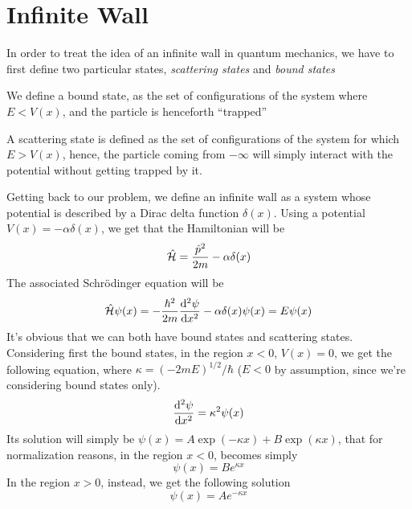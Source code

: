 \documentclass[../qm.tex]{subfiles}
\begin{document}
	\section{Infinite Wall}
	In order to treat the idea of an infinite wall in quantum mechanics, we have to first define two particular states, \textit{scattering states} and \textit{bound states}\\
	\begin{defn}
		We define a bound state, as the set of configurations of the system where $E<V(x)$, and the particle is henceforth ``trapped''
	\end{defn}
	\begin{defn}
		A scattering state is defined as the set of configurations of the system for which $E>V(x)$, hence, the particle coming from $-\infty$ will simply interact with the potential without getting trapped by it.
	\end{defn}
	Getting back to our problem, we define an infinite wall as a system whose potential is described by a Dirac delta function $\delta(x)$. Using a potential $V(x)=-\alpha\delta(x)$, we get that the Hamiltonian will be
	\begin{equation}
		\hat{\mathcal{H}}=\frac{\hat{p}^2}{2m}-\alpha\delta(x)
		\label{eq:diracdelta}
	\end{equation}
	The associated Schrödinger equation will be
	\begin{equation}
		\opr{\ham}\psi(x)=-\frac{\hbar^2}{2m}\derivative[2]{\psi}{x}-\alpha\delta(x)\psi(x)=E\psi(x)
		\label{eq:diracdeltapot}
	\end{equation}
	It's obvious that we can both have bound states and scattering states. Considering first the bound states, in the region $x<0$, $V(x)=0$, we get the following equation, where $\kappa=(-2mE)^{1/2}/\hbar$ ($E<0$ by assumption, since we're considering bound states only).
	\begin{equation*}
		\derivative[2]{\psi}{x}=\kappa^2\psi(x)
	\end{equation*}
	Its solution will simply be $\psi(x)=A\exp(-\kappa x)+B\exp(\kappa x)$, that for normalization reasons, in the region $x<0$, becomes simply
	\begin{equation}
		\psi(x)=Be^{\kappa x}
		\label{eq:solutionbounddeltaxneg}
	\end{equation}
	In the region $x>0$, instead, we get the following solution
	\begin{equation}
		\psi(x)=Ae^{-\kappa x}
		\label{eq:solutionboundxpos}
	\end{equation}
\end{document}
